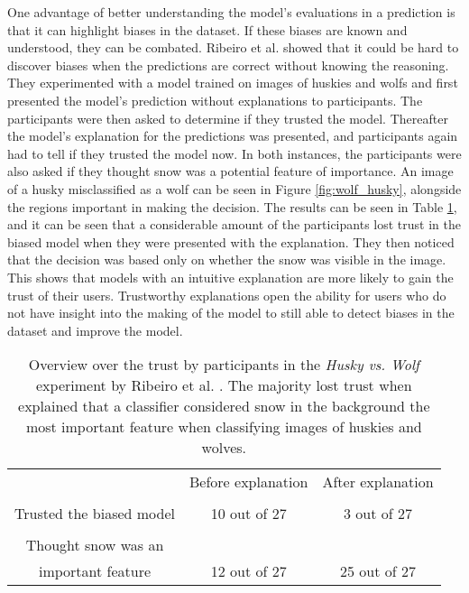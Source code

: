 One advantage of better understanding the model's evaluations in a prediction is that it can highlight biases in the dataset. If these biases are known and understood, they can be combated. Ribeiro et al. \cite{ribeiroWhyShouldTrust2016} showed that it could be hard to discover biases when the predictions are correct without knowing the reasoning. They experimented with a model trained on images of huskies and wolfs and first presented the model's prediction without explanations to participants. The participants were then asked to determine if they trusted the model. Thereafter the model's explanation for the predictions was presented, and participants again had to tell if they trusted the model now. In both instances, the participants were also asked if they thought snow was a potential feature of importance. An image of a husky misclassified as a wolf can be seen in Figure \ref{fig:wolf_husky}, alongside the regions important in making the decision. The results can be seen in Table \ref{table:husky_vs_wolf}, and it can be seen that a considerable amount of the participants lost trust in the biased model when they were presented with the explanation. They then noticed that the decision was based only on whether the snow was visible in the image. This shows that models with an intuitive explanation are more likely to gain the trust of their users. Trustworthy explanations open the ability for users who do not have insight into the making of the model to still able to detect biases in the dataset and improve the model. 

\begin{table}[htb]
    \centering
    \begin{tabular}{ c c c} 
     
               & Before explanation & After explanation\\ [0.5ex] 
        \Xhline{1.5pt} \\ 
            Trusted the biased model & 10 out of 27 & 3 out of 27 \\  [0.5ex]
        \hline  \\ 
            Thought snow was an \\ important feature & 12 out of 27 & 25 out of 27 \\ [1ex] 
        \hline
    \end{tabular}
    \caption[Overview over the participants trust in the \textit{Husky vs. Wolf} experiment.]{Overview over the trust by participants in the \textit{Husky vs. Wolf} experiment by Ribeiro et al. \cite{ribeiroWhyShouldTrust2016}. The majority lost trust when explained that a classifier considered snow in the background the most important feature when classifying images of huskies and wolves.}
    \label{table:husky_vs_wolf}
\end{table}

